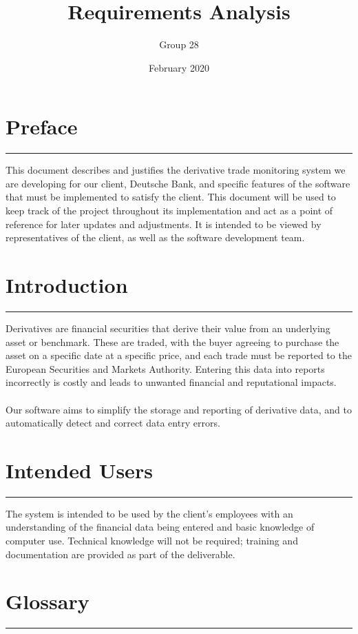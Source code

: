 \documentclass[8pt]{extarticle}
\title{Requirements Analysis}
\author{Group 28}
\date{February 2020}
\begin{document}
\maketitle

\section*{Preface}
\hrule
\vspace{9pt}

This document describes and justifies the derivative trade monitoring system we are developing for our client, Deutsche Bank, and specific features of the software that must be implemented to satisfy the client.
This document will be used to keep track of the project throughout its implementation and act as a point of reference for later updates and adjustments. It is intended to be viewed by representatives of the client, as well as the software development team. 

 

\section*{Introduction}
\hrule
\vspace{9pt}

Derivatives are financial securities that derive their value from an underlying asset or benchmark. These are traded, with the buyer agreeing to purchase the asset on a specific date at a specific price, and each trade must be reported to the European Securities and Markets Authority. Entering this data into reports incorrectly is costly and leads to unwanted financial and reputational impacts.  
\\ \\
Our software aims to simplify the storage and reporting of derivative data, and to automatically detect and correct data entry errors. 

\section*{Intended Users}
\hrule
\vspace{9pt}

The system is intended to be used by the client’s employees with an understanding of the financial data being entered and basic knowledge of computer use. Technical knowledge will not be required; training and documentation are provided as part of the deliverable. 

\section*{Glossary}
\hrule
\vspace{9pt}
\end{document}
